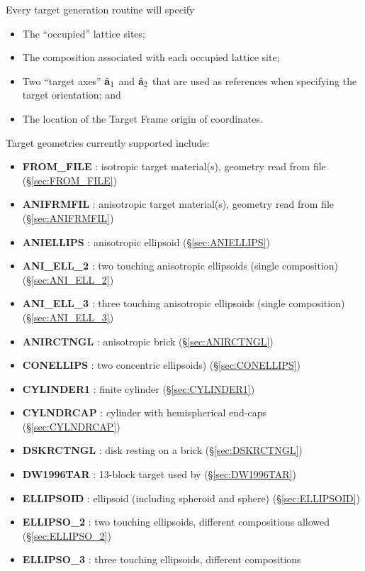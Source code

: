 Every target generation routine will specify 
\begin{itemize}
\item The ``occupied'' lattice sites;
\item The composition associated with each occupied lattice site;
\item Two ``target
axes'' $\hat{\bf a}_1$ and $\hat{\bf a}_2$ that are used as references when specifying
the target orientation; and
\item The location of the Target Frame origin of coordinates.
\end{itemize}
Target geometries currently supported include:
\begin{itemize}
\item {\bf FROM\_FILE} : isotropic target material(s), geometry read from file
                         (\S\ref{sec:FROM_FILE})
\item {\bf ANIFRMFIL} : anisotropic target material(s), geometry read from file
                        (\S\ref{sec:ANIFRMFIL})
\item {\bf ANIELLIPS} : anisotropic ellipsoid (\S\ref{sec:ANIELLIPS})
\item {\bf ANI\_ELL\_2} : two touching anisotropic ellipsoids (single 
                          composition) (\S\ref{sec:ANI_ELL_2})
\item {\bf ANI\_ELL\_3} : three touching anisotropic ellipsoids (single 
                          composition) (\S\ref{sec:ANI_ELL_3})
\item {\bf ANIRCTNGL} : anisotropic brick (\S\ref{sec:ANIRCTNGL})
\item {\bf CONELLIPS} : two concentric ellipsoids) (\S\ref{sec:CONELLIPS})
\item {\bf CYLINDER1} : finite cylinder (\S\ref{sec:CYLINDER1})
\item {\bf CYLNDRCAP} : cylinder with hemispherical end-caps 
                        (\S\ref{sec:CYLNDRCAP})
\item {\bf DSKRCTNGL} : disk resting on a brick (\S\ref{sec:DSKRCTNGL})
\item {\bf DW1996TAR} : 13-block target used by \citet{Draine+Weingartner_1996}
                        (\S\ref{sec:DW1996TAR})
\item {\bf ELLIPSOID} : ellipsoid (including spheroid and sphere)
                        (\S\ref{sec:ELLIPSOID})
\item {\bf ELLIPSO\_2} : two touching ellipsoids, different compositions allowed
                         (\S\ref{sec:ELLIPSO_2})
\item {\bf ELLIPSO\_3} : three touching ellipsoids, different compositions

\end{itemize}
